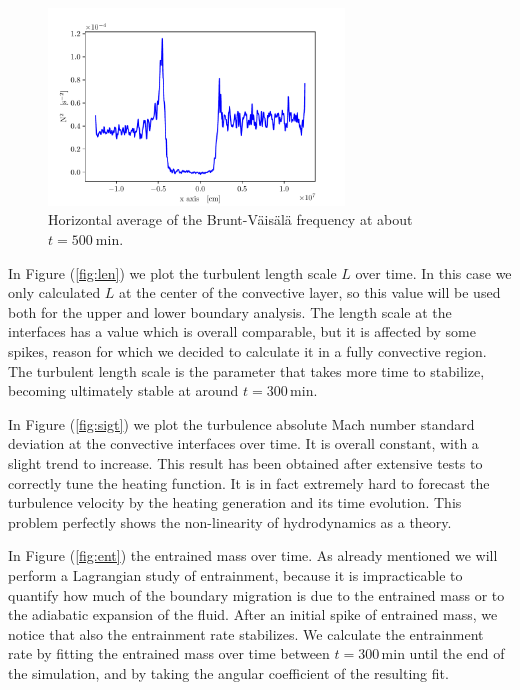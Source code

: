 \begin{figure}[t!]
\centering
\includegraphics[width=0.7\textwidth]{./img/brunt}
\caption{Horizontal average of the Brunt-Väisälä frequency at about $t=500 \ \mathrm{min}$.}
\label{fig:brunt}
\end{figure}
In Figure (\ref{fig:len}) we plot the turbulent length scale $L$ over time. In this case we only calculated $L$ at the center of the convective layer, so this value will be used both for the upper and lower boundary analysis. The length scale at the interfaces has a value which is overall comparable, but it is affected by some spikes, reason for which we decided to calculate it in a fully convective region. The turbulent length scale is the parameter that takes more time to stabilize, becoming ultimately stable at around $t = 300 \, \mathrm{min}$. 
 
In Figure (\ref{fig:sigt}) we plot the turbulence absolute Mach number standard deviation at the convective interfaces over time. It is overall constant, with a slight trend to increase. This result has been obtained after extensive tests to correctly tune the heating function. It is in fact extremely hard to forecast the turbulence velocity by the heating generation and its time evolution. This problem perfectly shows the non-linearity of hydrodynamics as a theory.

In Figure (\ref{fig:ent}) the entrained mass over time. As already mentioned we will perform a Lagrangian study of entrainment, because it is impracticable to quantify how much of the boundary migration is due to the entrained mass or to the adiabatic expansion of the fluid. After an initial spike of entrained mass, we notice that also the entrainment rate stabilizes. We calculate the entrainment rate by fitting the entrained mass over time between $t = 300 \, \mathrm{min}$ until the end of the simulation, and by taking the angular coefficient of the resulting fit. 


